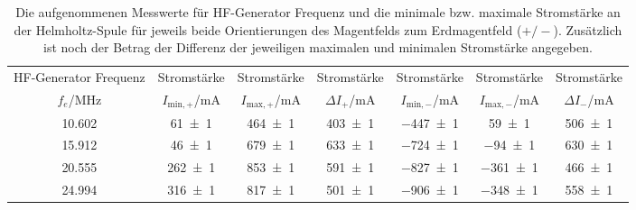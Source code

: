 \begin{table}[!h]
	\centering
	\begin{adjustbox}{width=\textwidth}
	\begin{tabular}{ccccccc}
		\toprule
		HF-Generator Frequenz & Stromstärke & Stromstärke & Stromstärke & Stromstärke & Stromstärke & Stromstärke\\
		$f_e$/\si{\mega\hertz} & $I_{\mathrm{min,+}}$/\si{\milli\ampere} & $I_{\mathrm{max,+}}$/\si{\milli\ampere} & $\Delta I_{+}$/\si{\milli\ampere} & $I_{\mathrm{min,-}}$/\si{\milli\ampere} & $I_{\mathrm{max,-}}$/\si{\milli\ampere} & $\Delta I_{-}$/\si{\milli\ampere}\\
\midrule
		\num{10.602} & \num{61(1)} & \num{464(1)} & \num{403(1)} & \num{-447(1)} & \num{59(1)} & \num{506(1)}\\
		\num{15.912} & \num{46(1)} & \num{679(1)} & \num{633(1)} & \num{-724(1)} & \num{-94(1)} & \num{630(1)}\\
		\num{20.555} & \num{262(1)} & \num{853(1)} & \num{591(1)} & \num{-827(1)} & \num{-361(1)} & \num{466(1)}\\
		\num{24.994} & \num{316(1)} & \num{817(1)} & \num{501(1)} & \num{-906(1)} & \num{-348(1)} & \num{558(1)}\\
		\bottomrule
	\end{tabular}
	\end{adjustbox}
	\caption{Die aufgenommenen Messwerte für HF-Generator Frequenz und die minimale bzw. maximale
Stromstärke an der Helmholtz-Spule für jeweils beide Orientierungen des Magentfelds zum Erdmagentfeld ($+/-$).
Zusätzlich ist noch der Betrag der Differenz der jeweiligen maximalen und minimalen Stromstärke angegeben. \label{tab:messwerte_I}}
\end{table}
